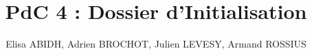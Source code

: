 \documentclass[a4paper]{article}
\begin{document}
\title{PdC 4 : Dossier d'Initialisation}
\author{Elisa ABIDH, Adrien BROCHOT, Julien LEVESY, Armand ROSSIUS}

\maketitle


\newpage
\tableofcontents
\newpage




\newpage

\newpage


\end{document}
